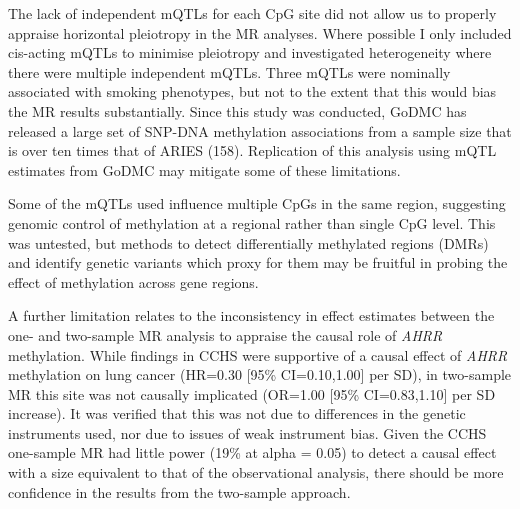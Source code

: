\documentclass[11pt,oneside]{bristolthesis}
\begin{document}
The lack of independent mQTLs for each CpG site did not allow us to properly appraise horizontal pleiotropy in the MR analyses. Where possible I only included cis-acting mQTLs to minimise pleiotropy and investigated heterogeneity where there were multiple independent mQTLs. Three mQTLs were nominally associated with smoking phenotypes, but not to the extent that this would bias the MR results substantially. Since this study was conducted, GoDMC has released a large set of SNP-DNA methylation associations from a sample size that is over ten times that of ARIES (158). Replication of this analysis using mQTL estimates from GoDMC may mitigate some of these limitations.

Some of the mQTLs used influence multiple CpGs in the same region, suggesting genomic control of methylation at a regional rather than single CpG level. This was untested, but methods to detect differentially methylated regions (DMRs) and identify genetic variants which proxy for them may be fruitful in probing the effect of methylation across gene regions.

A further limitation relates to the inconsistency in effect estimates between the one- and two-sample MR analysis to appraise the causal role of \emph{AHRR} methylation. While findings in CCHS were supportive of a causal effect of \emph{AHRR} methylation on lung cancer (HR=0.30 {[}95\% CI=0.10,1.00{]} per SD), in two-sample MR this site was not causally implicated (OR=1.00 {[}95\% CI=0.83,1.10{]} per SD increase). It was verified that this was not due to differences in the genetic instruments used, nor due to issues of weak instrument bias. Given the CCHS one-sample MR had little power (19\% at alpha = 0.05) to detect a causal effect with a size equivalent to that of the observational analysis, there should be more confidence in the results from the two-sample approach.
\end{document}
